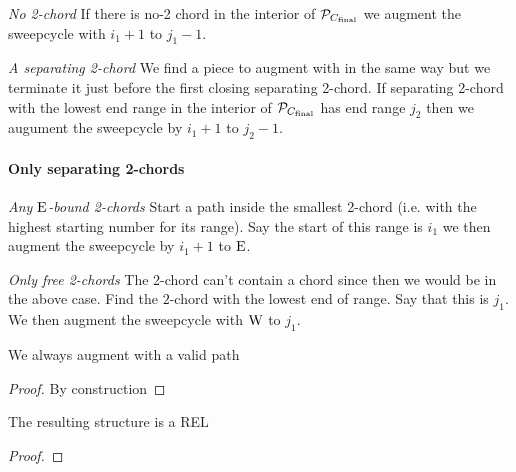 
    \emph{No 2-chord}
    If there is no-2 chord in the interior of $\P_{C_\text{final}}$ we augment the sweepcycle with $i_1 +1$ to $j_1 -1$.

    \emph{A separating 2-chord}
    We find a piece to augment with in the same way  but we terminate it just before the first closing separating 2-chord. If separating 2-chord with the lowest end range in the interior of $\P_{C_\text{final}}$ has end range $j_2$ then we augument the sweepcycle by  $i_1 +1$ to $j_2 -1$.

    \paragraph{Only separating 2-chords}
    \emph{Any $\pE$-bound 2-chords} 
    Start a path inside the smallest 2-chord (i.e. with the highest starting number for its range). Say the start of this range is $i_1$ we then augment the sweepcycle by $i_1 +1$ to $\pE$.

    \emph{Only free 2-chords}
    The 2-chord can't contain a chord since then we would be in the above case.
    Find the $2$-chord with the lowest end of range. Say that this is $j_1$. We then augment the sweepcycle with $\pW$ to $j_1$.

    \begin{lemma}
      We always augment with a valid path
    \end{lemma}
    \begin{proof}
      By construction
    \end{proof}

    \begin{lemma}
      \label{lm:sweep:REL}
      The resulting structure is a REL
    \end{lemma}

    \begin{proof}

    \end{proof}

